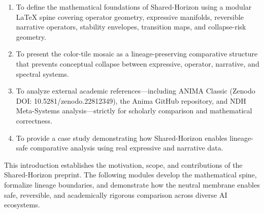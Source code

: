 \begin{enumerate}
    \item To define the mathematical foundations of Shared-Horizon using a
    modular LaTeX spine covering operator geometry, expressive manifolds,
    reversible narrative operators, stability envelopes, transition maps, and
    collapse-risk geometry.

    \item To present the color-tile mosaic as a lineage-preserving comparative
    structure that prevents conceptual collapse between expressive, operator,
    narrative, and spectral systems.

    \item To analyze external academic references---including ANIMA Classic
    (Zenodo DOI: 10.5281/zenodo.22812349), the Anima GitHub repository, and NDH
    Meta-Systems analysis---strictly for scholarly comparison and mathematical
    correctness.

    \item To provide a case study demonstrating how Shared-Horizon enables
    lineage-safe comparative analysis using real expressive and narrative data.
\end{enumerate}

This introduction establishes the motivation, scope, and contributions of the
Shared-Horizon preprint. The following modules develop the mathematical spine,
formalize lineage boundaries, and demonstrate how the neutral membrane enables
safe, reversible, and academically rigorous comparison across diverse AI
ecosystems.
